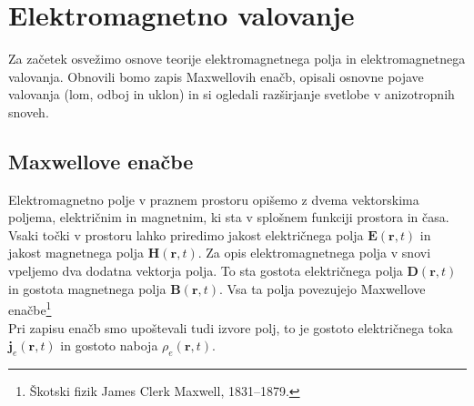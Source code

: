 
\chapter{Elektromagnetno valovanje}
Za začetek osvežimo osnove teorije elektromagnetnega polja in elektromagnetnega valovanja. 
Obnovili bomo zapis Maxwellovih enačb, opisali osnovne pojave valovanja (lom, odboj in uklon)
in si ogledali razširjanje svetlobe v anizotropnih snoveh. 

\section{Maxwellove enačbe}
Elektromagnetno polje v praznem prostoru opišemo z dvema vektorskima
poljema, električnim in magnetnim, ki sta v splošnem funkciji prostora
in časa. Vsaki točki v prostoru lahko priredimo jakost
električnega polja $\mathbf{E}(\mathbf{r},t)$ in jakost
magnetnega polja $\mathbf{H}(\mathbf{r},t)$. Za opis elektromagnetnega
polja v snovi vpeljemo dva dodatna vektorja polja. To sta gostota
električnega polja $\mathbf{D}(\mathbf{r},t)$ in gostota magnetnega
polja $\mathbf{B}(\mathbf{r},t)$.
Vsa ta polja povezujejo Maxwellove enačbe\footnote{
Škotski fizik James Clerk Maxwell, 1831--1879.}
\\
Pri zapisu enačb smo upoštevali tudi izvore polj, to je gostoto
električnega toka $\mathbf{j}_e(\mathbf{r},t)$ in gostoto naboja $\rho_{e}(\mathbf{r},t)$. 

